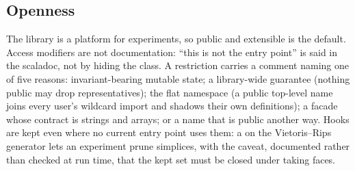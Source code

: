 \subsection{Openness}\label{sec:openness}

The library is a platform for experiments, so public and extensible is the default. Access modifiers are not documentation:
``this is not the entry point'' is said in the scaladoc, not by hiding the class. A restriction carries a comment naming one
of five reasons: invariant-bearing mutable state; a library-wide guarantee (nothing public may drop representatives); the
flat namespace (a public top-level name joins every user's wildcard import and shadows their own definitions); a facade whose
contract is strings and arrays; or a name that is public another way. Hooks are kept even where no current entry point uses
them: a  on the Vietoris--Rips generator lets an experiment prune simplices, with the caveat, documented
rather than checked at run time, that the kept set must be closed under taking faces.
